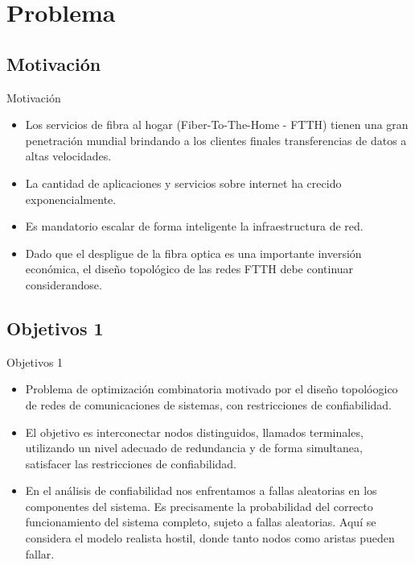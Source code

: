\section{Problema}
\subsection{Motivación}
\begin{frame}%
    \begin{block}{Motivación}
    \begin{itemize} 
    	\item Los servicios de fibra al hogar (Fiber-To-The-Home - FTTH) tienen una gran penetración mundial brindando a los clientes finales transferencias de datos a altas velocidades.
    	\item La cantidad de aplicaciones y servicios sobre internet ha crecido exponencialmente.
    	\item Es mandatorio escalar de forma inteligente la infraestructura de red.
    	\item Dado que el despligue de la fibra optica es una importante inversión económica, el diseño topológico de las redes FTTH debe continuar considerandose.
	\end{itemize} 
    \end{block}
\end{frame}

\subsection{Objetivos 1}
\begin{frame}%
    \begin{block}{Objetivos 1}
	\begin{itemize} 
    	\item Problema de optimización combinatoria motivado por el diseño topolóogico de redes de comunicaciones 
de sistemas, con restricciones de confiabilidad.
		\item El objetivo es interconectar nodos distinguidos, llamados terminales, utilizando un nivel adecuado de redundancia y de forma simultanea, satisfacer las restricciones de confiabilidad.
	\item En el análisis de confiabilidad nos enfrentamos a fallas aleatorias en los componentes del sistema. Es precisamente la probabilidad del correcto funcionamiento del sistema completo, sujeto a fallas aleatorias. Aquí se considera el modelo realista hostil, donde tanto nodos como aristas pueden fallar.
	\end{itemize} 
    \end{block}
\end{frame}

